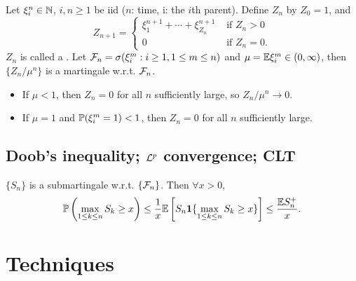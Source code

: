 \documentclass[10pt,a4paper]{article}
\begin{document}
\begin{exbox}
	\begin{example}\label{eg:branching_process}\rm
		Let $\xi_i^{n}\in\mathbb N$, $i,n\geq 1$ be iid ($n$: time, i: the $i$th parent). Define $Z_n$ by $Z_0=1$, and 
		{\setlength\abovedisplayskip{0.15cm}
		\setlength\belowdisplayskip{0.15cm}
		\begin{equation*}
			Z_{n+1}=\begin{cases}
				\xi_1^{n+1}+\cdots + \xi_{Z_n}^{n+1} & \text{ if } Z_n > 0 \\
				0	& \text{ if } Z_n=0.
			\end{cases}
		\end{equation*}}  
		$Z_n$ is called a . Let ${\cal F}_n=\sigma(\xi_i^m:i\geq 1, 1\leq m\leq n)$ and $\mu=\mathbb E \xi_i^m\in(0,\infty )$, then $\{Z_n/\mu^n\}$ is a martingale w.r.t. ${\cal F}_n$.    
		\begin{itemize}
			\item If $\mu<1$, then $Z_n=0$ for all $n$ sufficiently large, so $Z_n/\mu^n\to 0$.
			\item If $\mu=1$ and $\mathbb P(\xi_i^m=1)<1$, then $Z_n=0$ for all $n$ sufficiently large.        
		\end{itemize}
	\end{example}
\end{exbox}


\subsection{Doob's inequality; ${\cal L}^p$ convergence; CLT}\label{sec:doob_Lp_CLT}
\begin{thmbox}
	\begin{theorem}\label{thm:Doob_ineq}\rm
		$\{S_n\}$ is a submartingale w.r.t. $\{{\cal F}_n\}$. Then $\forall x>0$,
		{\setlength\abovedisplayskip{0.15cm}
		\setlength\belowdisplayskip{0.15cm}
		\begin{equation*}
			\mathbb P\left( {\max_{1\leq k\leq n} S_k\geq x}\right)\leq \frac{1}{x}\mathbb E\left[ {S_n{\boldsymbol 1}\{\max_{1\leq k\leq n}S_k\geq x\}}\right]\leq \frac{\mathbb E S_n^+}{x}.
		\end{equation*}}   
	\end{theorem}
\end{thmbox}


\section{Techniques}\label{sec:techniques}
\end{document}
